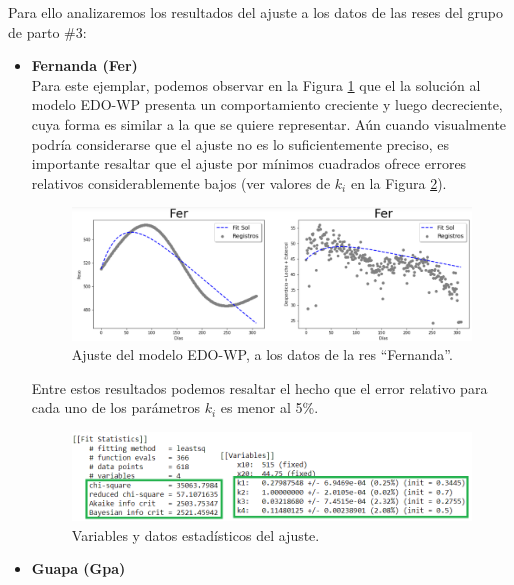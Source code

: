 Para ello analizaremos los resultados del ajuste a los datos de las reses del grupo de parto \#3:\\

\begin{itemize}
    \item \textbf{Fernanda (Fer)}\\
    
    Para este ejemplar, podemos observar en la Figura \ref{ajustemodFerpng} que el la solución al modelo EDO-WP presenta un comportamiento creciente y luego decreciente, cuya forma  es similar a la que se quiere representar. Aún cuando visualmente podría considerarse que el ajuste no es lo suficientemente preciso, es importante resaltar que el ajuste por mínimos cuadrados ofrece errores relativos considerablemente bajos (ver valores de $k_{i}$ en la Figura \ref{ajustemodFerstatspng}).
        \begin{figure}[H]
            \centering
            \includegraphics[scale=0.5]{img/ajustemodFer.png}
            \caption{Ajuste del modelo EDO-WP, a los datos de la res ``Fernanda''.}
            \label{ajustemodFerpng}
        \end{figure}
    Entre estos resultados podemos resaltar el hecho que el error relativo para cada uno de los parámetros $k_{i}$ es menor al 5\%.
        \begin{figure}[H]
            \centering
            \includegraphics[scale=0.65]{img/ajustemodFerstats.png}
            \caption{Variables y datos estadísticos del ajuste.}
            \label{ajustemodFerstatspng}
        \end{figure}
        
    \pagebreak
    \item \textbf{Guapa (Gpa)}\\
    

\end{itemize}
